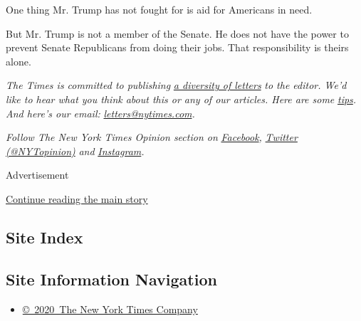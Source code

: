 One thing Mr. Trump has not fought for is aid for Americans in need.

But Mr. Trump is not a member of the Senate. He does not have the power
to prevent Senate Republicans from doing their jobs. That responsibility
is theirs alone.

\emph{The Times is committed to publishing}
\href{https://www.nytimes.com/2019/01/31/opinion/letters/letters-to-editor-new-york-times-women.html}{\emph{a
diversity of letters}} \emph{to the editor. We'd like to hear what you
think about this or any of our articles. Here are some}
\href{https://help.nytimes.com/hc/en-us/articles/115014925288-How-to-submit-a-letter-to-the-editor}{\emph{tips}}\emph{.
And here's our email:}
\href{mailto:letters@nytimes.com}{\emph{letters@nytimes.com}}\emph{.}

\emph{Follow The New York Times Opinion section on}
\href{https://www.facebook.com/nytopinion}{\emph{Facebook}}\emph{,}
\href{http://twitter.com/NYTOpinion}{\emph{Twitter (@NYTopinion)}}
\emph{and}
\href{https://www.instagram.com/nytopinion/}{\emph{Instagram}}\emph{.}

Advertisement

\protect\hyperlink{after-bottom}{Continue reading the main story}

\hypertarget{site-index}{%
\subsection{Site Index}\label{site-index}}

\hypertarget{site-information-navigation}{%
\subsection{Site Information
Navigation}\label{site-information-navigation}}

\begin{itemize}
\tightlist
\item
  \href{https://help.nytimes.com/hc/en-us/articles/115014792127-Copyright-notice}{©~2020~The
  New York Times Company}
\end{itemize}

